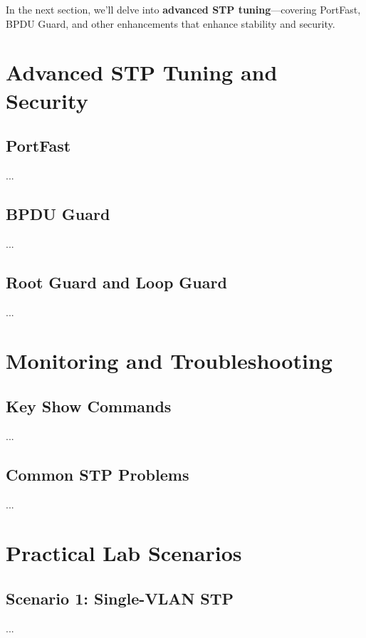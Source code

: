 \documentclass[a4paper]{report}
\begin{document}
In the next section, we’ll delve into \textbf{advanced STP tuning}---covering PortFast, BPDU Guard, and other enhancements that enhance stability and security.




\chapter{Advanced STP Tuning and Security}
\section{PortFast}
...

\section{BPDU Guard}
...

\section{Root Guard and Loop Guard}
...

\chapter{Monitoring and Troubleshooting}
\section{Key Show Commands}
...

\section{Common STP Problems}
...

\chapter{Practical Lab Scenarios}
\section{Scenario 1: Single-VLAN STP}
...
\end{document}

